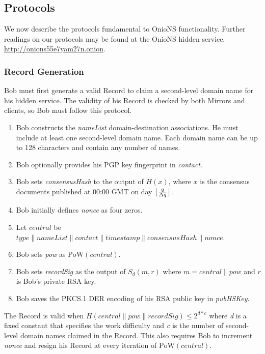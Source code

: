 \documentclass{sig-alternate}
\DeclarePairedDelimiter{\floor}{\lfloor}{\rfloor}
\newcommand*\concat{\mathbin{\|}}
\begin{document}
\subsection{Protocols} %

We now describe the protocols fundamental to OnioNS functionality. Further readings on our protocols may be found at the OnioNS hidden service, \url{http://onions55e7yam27n.onion}.

\subsubsection{Record Generation} %

Bob must first generate a valid Record to claim a second-level domain name for his hidden service. The validity of his Record is checked by both Mirrors and clients, so Bob must follow this protocol.

\begin{enumerate}[noitemsep]
	\item Bob constructs the \emph{nameList} domain-destination associations. He must include at least one second-level domain name. Each domain name can be up to 128 characters and contain any number of names.
	\item Bob optionally provides his PGP key fingerprint in \emph{contact}.
	\item Bob sets \emph{consensusHash} to the output of $ H(x) $, where $ x $ is the consensus documents published at 00:00 GMT on day $ \floor[\big]{\frac{q}{\Delta q}} $.
	\item Bob initially defines \emph{nonce} as four zeros.
	\item Let $ \mathit{central} $ be $\mathit{type} \concat \mathit{nameList} \concat \mathit{contact} \concat \mathit{timestamp} \concat \mathit{consensusHash} \concat \mathit{nonce} $.
	\item Bob sets \emph{pow} as $ \mathrm{PoW}(\mathit{central}) $.
	\item Bob sets \emph{recordSig} as the output of $ S_{d}(m, r) $ where $ m = \mathit{central} \concat \mathit{pow} $ and $ r $ is Bob's private RSA key.
	\item Bob saves the PKCS.1 DER encoding of his RSA public key in \emph{pubHSKey}.
\end{enumerate}

The Record is valid when $ H(\mathit{central} \concat \mathit{pow} \concat \mathit{recordSig}) \leq 2^{\mathit{d} * \mathit{c}} $ where \emph{d} is a fixed constant that specifies the work difficulty and \emph{c} is the number of second-level domain names claimed in the Record. This also requires Bob to increment \emph{nonce} and resign his Record at every iteration of $ \mathrm{PoW}(\mathit{central}) $.
\end{document}
